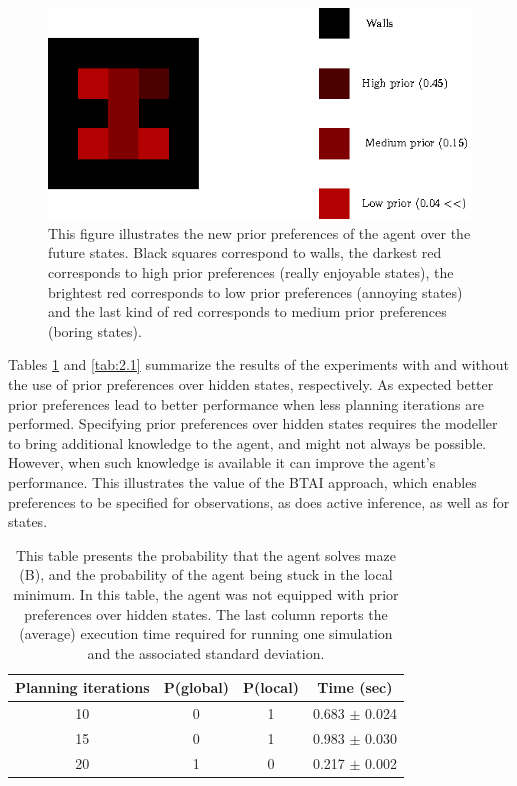 \documentclass[twoside,11pt]{article}
\begin{document}
\begin{figure}[H]
	\begin{center}
	\includegraphics[scale=1]{BTAI_Empirical_Article-figure5}
	\end{center}
\vspace{-0.25cm}
    \caption{
This figure illustrates the new prior preferences of the agent over the future states. Black squares correspond to walls, the darkest red corresponds to high prior preferences (really enjoyable states), the brightest red corresponds to low prior preferences (annoying states) and the last kind of red corresponds to medium prior preferences (boring states).}
    \label{fig:new_prior_pref}
\end{figure}

Tables \ref{tab:2} and \ref{tab:2.1} summarize the results of the experiments with and without the use of prior preferences over hidden states, respectively. As expected better prior preferences lead to better performance when less planning iterations are performed. Specifying prior preferences over hidden states requires the modeller to bring additional knowledge to the agent, and might not always be possible. However, when such knowledge is available it can improve the agent's performance. This illustrates the value of the BTAI approach, which enables preferences to be specified for observations, as does active inference, as well as for states.

\begin{table}[H]
\centering
\begin{tabular}{ |c|c|c|c| }
 \hline
 Planning iterations & P(global) & P(local) & Time (sec)\\
 \hline
 10 & 0 & 1 & 0.683 $\pm$ 0.024\\
 \hline
 15 & 0 & 1 & 0.983 $\pm$ 0.030\\
 \hline
 20 & 1 & 0 & 0.217 $\pm$ 0.002\\
 \hline
\end{tabular}
\caption{This table presents the probability that the agent solves maze (B), and the probability of the agent being stuck in the local minimum. In this table, the agent was not equipped with prior preferences over hidden states. The last column reports the (average) execution time required for running one simulation and the associated standard deviation.}
\label{tab:2}
\end{table}
\end{document}
